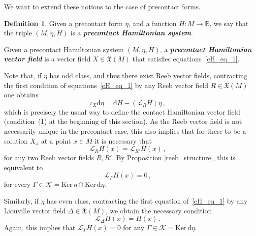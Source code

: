 \documentclass[11pt,twoside]{article}
\theoremstyle{plain}
\theoremstyle{definition}
\newtheorem{definition}[theorem]{Definition}
\newcommand{\R}{\mathbb{R}}
\renewcommand{\d}{\mathrm{d}}
\newcommand*{\inn}[1]{\iota_{#1}}
\newcommand{\Lie}{\mathscr{L}}
\newcommand{\X}{\mathfrak{X}}
\def\d{\mathrm{d}}
\newcommand\dfn[1]{{\textbf{\emph{#1}}}}
\def\X{\mathfrak{X}}
\def\d{\mathrm{d}}
\def\Ker{\mathrm{Ker \,}}
\def\Lie{\mathscr{L}}
\begin{document}
We want to extend these notions to the case of precontact forms.

\begin{definition}
    Given a precontact form $\eta$, and a function $H\colon M \to \R$, we say that the triple $(M,\eta,H)$ is a \dfn{precontact Hamiltonian system}.
\end{definition}

Given a precontact Hamiltonian system $(M,\eta,H)$, 
a \dfn{precontact Hamiltonian vector field} 
is a vector field $X \in \X (M)$ that satisfies equations~\eqref{cH_eq_1}.


Note that, if $\eta$ has odd class, and thus there exist Reeb vector fields, 
contracting the first condition of equations~\eqref{cH_eq_1} by any Reeb vector field $R\in \X (M)$ one obtains
\begin{equation}
	\inn{X} \d \eta = \d H - (\Lie_R H)\eta \,,
\end{equation}
which is precisely the usual way to define the contact Hamiltonian vector field
(condition~(1) at the beginning of this section).
As the Reeb vector field is not necessarily unique in the precontact case, 
this also implies that for there to be a solution $X_x$ at a point $x\in M$ 
it is necessary that
\begin{equation}
    \Lie_R H(x) = \Lie_{R'} H(x)\,,
\end{equation}
for any two Reeb vector fields $R,R'$.
By Proposition \ref{reeb_structure}, this is equivalent to
\begin{equation} \label{odd_constraint}
    \Lie_\Gamma H (x)=0\,,
\end{equation}
for every $\Gamma \in \mathcal{K}=\Ker \eta \cap \Ker \d \eta$.

Similarly, if $\eta$ has even class,
contracting the first equation of~\eqref{cH_eq_1} by any Liouville vector field $\Delta \in \X(M)$, 
we obtain the necessary condition
\begin{equation}\label{even_constraints}
  \Lie_{\Delta} H (x) = H(x)\,.  
\end{equation}
Again, this implies that $\Lie_\Gamma H(x) = 0$ for any $\Gamma \in \mathcal{K}= \Ker \d \eta$.
\end{document}
